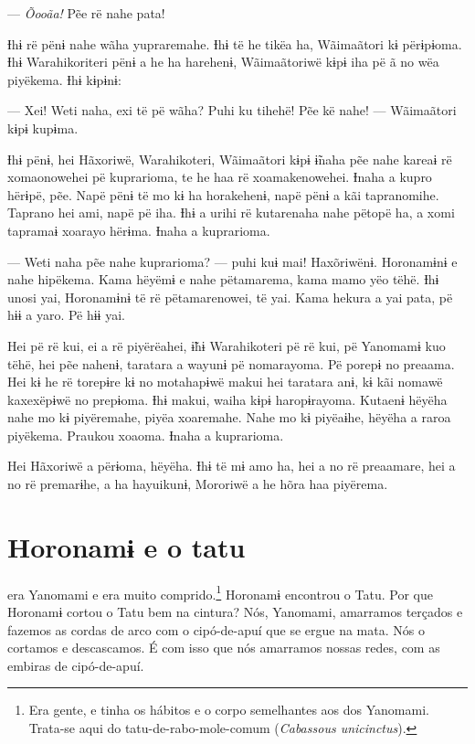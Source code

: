 --- \textit{Õooãa!} Pẽe rë nahe pata! 

Ɨhɨ rë pënɨ nahe wãha yupraremahe. Ɨhɨ të he tikëa ha, Wãimaãtori kɨ
përɨpɨoma. Ɨhɨ Warahikoriteri pënɨ a he ha harehenɨ, Wãimaãtoriwë kɨpɨ
iha pë ã no wëa piyëkema. Ɨhɨ kɨpɨnɨ:

--- Xei! Weti naha, exi të pë wãha? Puhi ku tihehë! Pẽe kë nahe! ---
Wãimaãtori kɨpɨ kupɨma.

Ɨhɨ pënɨ, hei Hãxoriwë, Warahikoteri, Wãimaãtori kɨpɨ ɨ̃naha pẽe nahe
kareaɨ rë xomaonowehei pë kuprarioma, te he haa rë xoamakenowehei. Ɨnaha
a kupro hërɨpë, pẽe. Napë pënɨ të mo kɨ ha horakehenɨ, napë pënɨ a kãi
tapranomihe. Taprano hei ami, napë pë iha. Ɨhɨ a urihi rë kutarenaha
nahe pëtopë ha, a xomi tapramaɨ xoarayo hërɨma. Ɨnaha a kuprarioma. 

--- Weti naha pẽe nahe kuprarioma? --- puhi kuɨ mai! Haxõriwënɨ. Horonamɨnɨ
e nahe hipëkema. Kama hëyëmɨ e nahe pëtamarema, kama mamo yëo tëhë. Ɨhɨ
unosi yai, Horonamɨnɨ të rë pëtamarenowei, të yai. Kama hekura a yai
pata, pë hɨɨ a yaro. Pë hɨɨ yai. 

Hei pë rë kui, ei a rë piyërëahei, ɨ̃hɨ Warahikoteri pë rë kui, pë
Yanomamɨ kuo tëhë, hei pẽe nahenɨ, taratara a wayunɨ pë nomarayoma. Pë
porepɨ no preaama. Hei kɨ he rë torepɨre kɨ no motahapɨwë makui hei
taratara anɨ, kɨ kãi nomawë kaxexëpɨwë no prepɨoma. Ɨhɨ makui, waiha
kɨpɨ haropɨrayoma. Kutaenɨ hëyëha nahe mo kɨ piyëremahe, piyëa
xoaremahe. Nahe mo kɨ piyëaɨhe, hëyëha a raroa piyëkema. Praukou xoaoma.
Ɨnaha a kuprarioma. 

Hei Hãxoriwë a përɨoma, hëyëha. Ɨhɨ të mɨ amo ha, hei a no rë preaamare,
hei a no rë premarɨhe, a ha hayuikunɨ, Mororiwë a he hõra haa piyërema.

\chapter*{Horonamɨ e o tatu\smallskip{}}

 era Yanomami e era muito comprido.\footnote{Era gente, e tinha os hábitos e o corpo semelhantes aos dos Yanomami. Trata-se aqui do tatu-de-rabo-mole-comum (\textit{Cabassous unicinctus}).}  Horonamɨ encontrou o Tatu. Por que Horonamɨ cortou o Tatu bem na cintura? Nós, Yanomami, amarramos terçados e fazemos as cordas de arco com o cipó-de-apuí que se ergue na
mata. Nós o cortamos e descascamos. É com isso que nós amarramos nossas
redes, com as embiras de cipó-de-apuí. 


